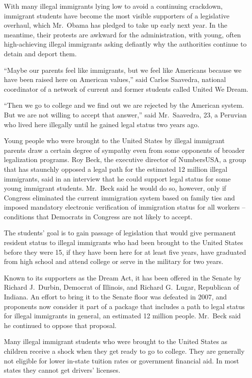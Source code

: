 ﻿\documentclass[12pt]{article}
\begin{document}
With many illegal immigrants lying low to avoid a continuing crackdown, immigrant students have
become the most visible supporters of a legislative overhaul, which Mr.~Obama has pledged to take up
early next year. In the meantime, their protests are awkward for the administration, with young,
often high-achieving illegal immigrants asking defiantly why the authorities continue to detain and
deport them.

``Maybe our parents feel like immigrants, but we feel like Americans because we have been raised
here on American values,'' said Carlos Saavedra, national coordinator of a network of current and
former students called United We Dream.

``Then we go to college and we find out we are rejected by the American system. But we are not
willing to accept that answer,'' said Mr.~Saavedra, 23, a Peruvian who lived here illegally until he
gained legal status two years ago.

Young people who were brought to the United States by illegal immigrant parents draw a certain
degree of sympathy even from some opponents of broader legalization programs. Roy Beck, the
executive director of NumbersUSA, a group that has staunchly opposed a legal path for the estimated
12 million illegal immigrants, said in an interview that he could support legal status for some
young immigrant students. Mr.~Beck said he would do so, however, only if Congress eliminated the
current immigration system based on family ties and imposed mandatory electronic verification of
immigration status for all workers -- conditions that Democrats in Congress are not likely to
accept.

The students' goal is to gain passage of legislation that would give permanent resident status to
illegal immigrants who had been brought to the United States before they were 15, if they have been
here for at least five years, have graduated from high school and attend college or serve in the
military for two years.

Known to its supporters as the Dream Act, it has been offered in the Senate by Richard J.~Durbin,
Democrat of Illinois, and Richard G.~Lugar, Republican of Indiana. An effort to bring it to the
Senate floor was defeated in 2007, and proponents now consider it part of a package that includes a
path to legal status for illegal immigrants in general, an estimated 12 million people. Mr.~Beck
said he continued to oppose that proposal.

Many illegal immigrant students who were brought to the United States as children receive a shock
when they get ready to go to college. They are generally not eligible for lower in-state tuition
rates or government financial aid. In most states they cannot get drivers' licenses.
\end{document}
